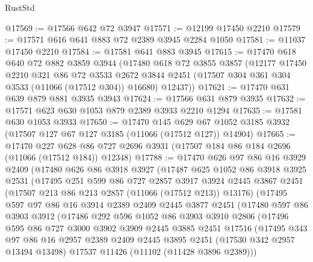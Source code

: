 \begin{lexlean}{RustStd}
\begin{coremodule}
@17569 := @17566 @642 @72 @3947
@17571 := @12199 @17450 @2210
@17579 := @17571 @616 @641 @883 @72 @2389 @3945 @2284 @1050
@17581 := @11037 @17450 @2210
@17584 := @17581 @641 @883 @3945
@17615 := @17470
    @618
    @640
    @72
    @882
    @3859
    @3944
    (@17480
      @618
      @72
      @3855
      @3857
      (@12177
        @17450
        @2210
        @321
        @86
        @72
        @3533
        @2672
        @3844
        @2451
        (@17507 @304 @361 @304 @3533 (@11066 (@17512 @304)) @16680)
        @12437))
@17621 := @17470 @631 @639 @879 @881 @3935 @3943
@17624 := @17566 @631 @879 @3935
@17632 := @17571 @623 @630 @1053 @879 @2389 @3933 @2210 @1294
@17635 := @17581 @630 @1053 @3933
@17650 := @17470
    @145
    @629
    @67
    @1052
    @3185
    @3932
    (@17507 @127 @67 @127 @3185 (@11066 (@17512 @127)) @14904)
@17665 := @17470
    @227
    @628
    @86
    @727
    @2696
    @3931
    (@17507 @184 @86 @184 @2696 (@11066 (@17512 @184)) @12348)
@17788 := @17470
    @626
    @97
    @86
    @16
    @3929
    @2409
    (@17480
      @626
      @86
      @3918
      @3927
      (@17487
        @625
        @1052
        @86
        @3918
        @3925
        @2531
        (@17495
          @251
          @599
          @86
          @727
          @2857
          @3917
          @3924
          @2445
          @3867
          @2451
          (@17507 @213 @86 @213 @2857 (@11066 (@17512 @213)) @13176)
          (@17495
            @597
            @97
            @86
            @16
            @3914
            @2389
            @2409
            @2445
            @3877
            @2451
            (@17480
              @597
              @86
              @3903
              @3912
              (@17486
                @292
                @596
                @1052
                @86
                @3903
                @3910
                @2806
                (@17496
                  @595
                  @86
                  @727
                  @3000
                  @3902
                  @3909
                  @2445
                  @3885
                  @2451
                  @17516
                  (@17495
                    @343
                    @97
                    @86
                    @16
                    @2957
                    @2389
                    @2409
                    @2445
                    @3895
                    @2451
                    (@17530 @342 @2957 @13494 @13498)
                    @17537
                    @11426
                    (@11102 (@11428 @3896 @2389)))

\end{coremodule}
\end{lexlean}
